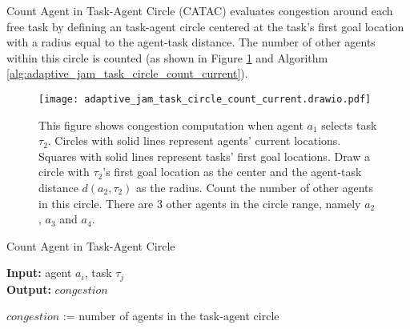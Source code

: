 \documentclass[letterpaper]{article} %
\begin{document}
Count Agent in Task-Agent Circle (CATAC) evaluates congestion around each free task by defining an task-agent circle centered at the task’s first goal location with a radius equal to the agent-task distance. 
The number of other agents within this circle is counted (as shown in Figure \ref{fig:adaptive_jam_task_circle_count_current} and Algorithm \ref{alg:adaptive_jam_task_circle_count_current}). 


\begin{figure}[t]
    \centering
    \texttt{[image: adaptive\_jam\_task\_circle\_count\_current.drawio.pdf]}
    \caption{This figure shows congestion computation when agent $a_1$ selects task $\tau_2$. 
    Circles with solid lines represent agents' current locations.
    Squares with solid lines represent tasks' first goal locations.
    Draw a circle with $\tau_2$'s first goal location as the center and the agent-task distance $d(a_2, \tau_2)$ as the radius. 
    Count the number of other agents in this circle. 
    There are 3 other agents in the circle range, namely $a_2$, $a_3$ and $a_4$.
    }
    \label{fig:adaptive_jam_task_circle_count_current}
\end{figure}

\begin{algorithm}
    \caption{Count Agent in Task-Agent Circle}
    \label{alg:adaptive_jam_task_circle_count_current} 
    \textbf{Input:} agent $a_i$, task $\tau_j$ \\
    \textbf{Output:} $congestion$
    \begin{algorithmic}[1]

    \STATE $congestion$ := number of agents in the task-agent circle

    \end{algorithmic}
\end{algorithm}
\end{document}
